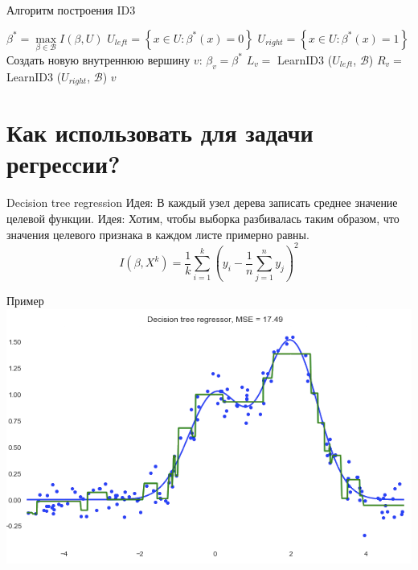 \documentclass[10pt]{beamer}
\begin{document}
{
\begin{frame}{Алгоритм построения ID3}
  \begin{algorithmic}[1]
         \State {}
       \EndIf
       \State $\beta^* = \max\limits_{\beta \in \mathscr{B}} I(\beta, U)$
       \State $U_{left} = \left\{ x \in U : \beta^*(x) = 0\right\}$	
       \State $U_{right} = \left\{ x \in U : \beta^*(x) = 1\right\}$	
         \State {}
       \EndIf
       \State Создать новую внутреннюю вершину $v$: $\beta_v = \beta^*$
       \State $L_v =$ LearnID3 ($U_{left}$, $\mathscr{B}$)
       \State $R_v =$ LearnID3 ($U_{right}$, $\mathscr{B}$)
       \State \Return $v$
    \EndFunction
  \end{algorithmic}    
\end{frame}
}

\section{Как использовать для задачи регрессии?}

\begin{frame}{Decision tree regression}
  \alert{Идея}: В каждый узел дерева записать среднее значение целевой функции. 
  \pause
  \bigbreak
  \alert{Идея}: Хотим, чтобы выборка разбивалась таким образом, что значения целевого признака в каждом листе примерно равны.
  \pause
  \bigbreak
  $$I(\beta,X^k)= \frac{1}{k} \sum\limits_{i=1}^k ( y_i - \frac{1}{n} \sum\limits_{j=1}^n y_j)^2$$
\end{frame}

\begin{frame}{Пример}
  \centering
  \includegraphics[width=0.9 \textwidth, keepaspectratio]{images/decision_tree}
\end{frame}
\end{document}
